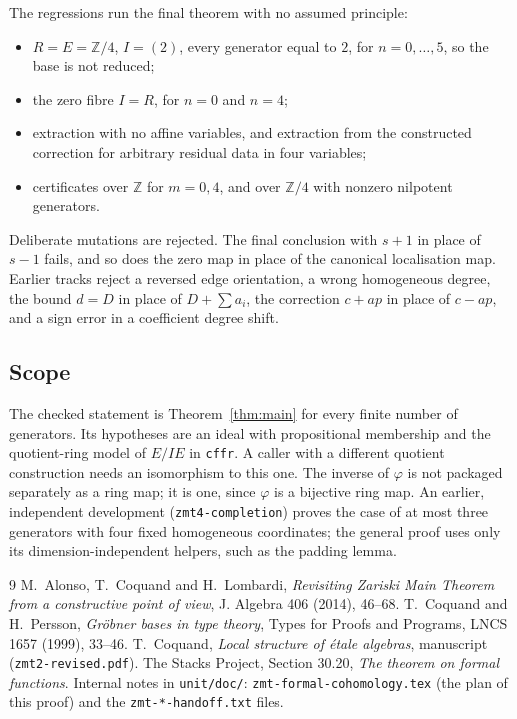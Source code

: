 \documentclass[11pt]{amsart}
\numberwithin{equation}{section}
\theoremstyle{definition}
\theoremstyle{remark}
\newcommand{\code}[1]{\texttt{#1}}
\newcommand{\ZZ}{\mathbb Z}
\begin{document}
The regressions run the final theorem with no assumed principle:
\begin{itemize}
\item $R=E=\ZZ/4$, $I=(2)$, every generator equal to $2$, for
$n=0,\ldots,5$, so the base is not reduced;
\item the zero fibre $I=R$, for $n=0$ and $n=4$;
\item extraction with no affine variables, and extraction from the
constructed correction for arbitrary residual data in four variables;
\item certificates over $\ZZ$ for $m=0,4$, and over $\ZZ/4$ with
nonzero nilpotent generators.
\end{itemize}
Deliberate mutations are rejected. The final conclusion with $s+1$ in
place of $s-1$ fails, and so does the zero map in place of the canonical
localisation map. Earlier tracks reject a reversed edge orientation, a
wrong homogeneous degree, the bound $d=D$ in place of $D+\sum a_i$, the
correction $c+ap$ in place of $c-ap$, and a sign error in a coefficient
degree shift.

\subsection{Scope}
The checked statement is Theorem~\ref{thm:main} for every finite
number of generators. Its hypotheses are an ideal with propositional
membership and the quotient-ring model of $E/IE$ in \code{cffr}. A caller
with a different quotient construction needs an isomorphism to this
one. The inverse of $\varphi$ is not packaged separately as a ring map;
it is one, since $\varphi$ is a bijective ring map. An earlier,
independent development (\code{zmt4-completion}) proves the case of at
most three generators with four fixed homogeneous coordinates; the
general proof uses only its dimension-independent helpers, such as the
padding lemma.

\begin{thebibliography}{9}
 M.~Alonso, T.~Coquand and H.~Lombardi,
\emph{Revisiting Zariski Main Theorem from a constructive point of
view}, J. Algebra 406 (2014), 46--68.
 T.~Coquand and H.~Persson, \emph{Gr\"obner bases in type
theory}, Types for Proofs and Programs, LNCS 1657 (1999), 33--46.
 T.~Coquand, \emph{Local structure of \'etale algebras},
manuscript (\code{zmt2-revised.pdf}).
 The Stacks Project, Section 30.20, \emph{The theorem
on formal functions}.
 Internal notes in \code{unit/doc/}:
\code{zmt-formal-cohomology.tex} (the plan of this proof) and the
\code{zmt-*-handoff.txt} files.
\end{thebibliography}
\end{document}
